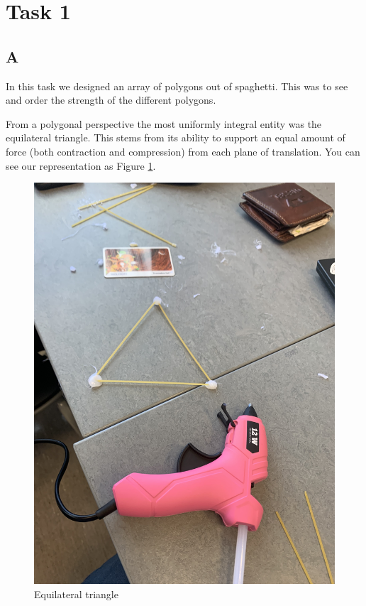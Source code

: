 \documentclass{report}
\begin{document}

\section{Task 1}

\subsection{A}

In this task we designed an array of polygons out of spaghetti. This was to see and order the strength of the different polygons.

From a polygonal perspective the most uniformly integral entity was the equilateral triangle. This stems from its ability to support an equal amount of force (both contraction and compression) from each plane of translation. You can see our representation as Figure \ref{fig:eq}.

\begin{figure}[H]
	\centering
	\includegraphics[width=.8\linewidth]{equalateral}

	\caption {Equilateral triangle}
	\label{fig:eq}
\end{figure}
\end{document}
